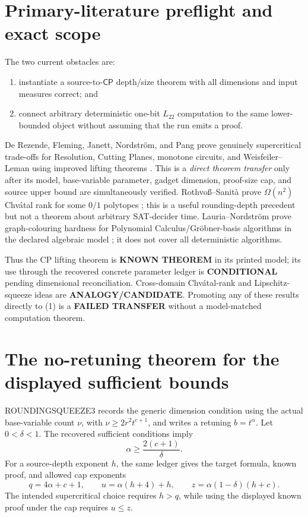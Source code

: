 \documentclass[11pt]{article}
\newcommand{\KNOWN}{\textbf{KNOWN THEOREM}}
\newcommand{\COND}{\textbf{CONDITIONAL}}
\newcommand{\Ltwo}{L_{22}}
\newcommand{\CP}{\mathsf{CP}}
\begin{document}
\section{Primary-literature preflight and exact scope}
The two current obstacles are:
\begin{enumerate}
\item instantiate a source-to-\(\CP\) depth/size theorem with all dimensions
and input measures correct; and
\item connect arbitrary deterministic one-bit \(\Ltwo\) computation to the
same lower-bounded object without assuming that the run emits a proof.
\end{enumerate}
De Rezende, Fleming, Janett, Nordstr\"om, and Pang prove genuinely
supercritical trade-offs for Resolution, Cutting Planes, monotone circuits,
and Weisfeiler--Leman using improved lifting theorems
\cite{derezende}.  This is a \emph{direct theorem transfer} only after its
model, base-variable parameter, gadget dimension, proof-size cap, and source
upper bound are simultaneously verified.  Rothvo\ss--Sanit\`a prove
\(\Omega(n^2)\) Chv\'atal rank for some \(0/1\) polytopes
\cite{rothvoss}; this is a useful rounding-depth precedent but not a theorem
about arbitrary SAT-decider time.  Lauria--Nordstr\"om prove graph-colouring
hardness for Polynomial Calculus/Gr\"obner-basis algorithms in the declared
algebraic model \cite{lauria}; it does not cover all deterministic algorithms.

Thus the CP lifting theorem is \KNOWN{} in its printed model; its use through
the recovered concrete parameter ledger is \COND{} pending dimensional
reconciliation.  Cross-domain Chv\'atal-rank and Lipschitz-squeeze ideas are
\textbf{ANALOGY/CANDIDATE}.  Promoting any of these results directly to (1)
is a \textbf{FAILED TRANSFER} without a model-matched computation theorem.

\section{The no-retuning theorem for the displayed sufficient bounds}
ROUNDINGSQUEEZE3 records the generic dimension condition using the actual
base-variable count \(\nu\), with \(\nu\ge 2r^2t^{c+1}\), and writes a
retuning \(b=t^\alpha\).  Let \(0<\delta<1\).  The recovered sufficient
conditions imply
\[
 \alpha\ge \frac{2(c+1)}{\delta}.                          \tag{2}
\]
For a source-depth exponent \(h\), the same ledger gives the target formula,
known proof, and allowed cap exponents
\[
 q=4\alpha+c+1,\qquad
 u=\alpha(h+4)+h,\qquad
 z=\alpha(1-\delta)(h+c).                                  \tag{3}
\]
The intended supercritical choice requires \(h>q\), while using the displayed
known proof under the cap requires \(u\le z\).
\end{document}

